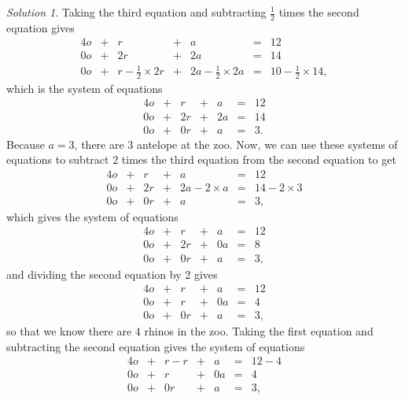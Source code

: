 \documentclass[
]{book}
\theoremstyle{definition}
\theoremstyle{definition}
\theoremstyle{definition}
\theoremstyle{definition}
\theoremstyle{remark}
\newtheorem*{solution}{Solution}
\begin{document}
\begin{solution}
Taking the third equation and subtracting \(\frac{1}{2}\) times the second equation gives
\begin{alignat*}{4}
o   & {}+{} &  r  & {}+{} & a  & {}={} & 12 \\
0o  & {}+{} &  2r & {}+{} & 2a & {}={} & 14 \\
0o  & {}+{} &  r - \frac{1}{2} \times 2r  & {}+{} & 2a - \frac{1}{2} \times 2a & {}={} & 10 - \frac{1}{2} \times 14,
\end{alignat*}
which is the system of equations
\begin{alignat*}{4}
o   & {}+{} &  r  & {}+{} & a  & {}={} & 12 \\
0o  & {}+{} &  2r & {}+{} & 2a & {}={} & 14 \\
0o  & {}+{} &  0r  & {}+{} & a & {}={} & 3.
\end{alignat*}
Because \(a = 3\), there are 3 antelope at the zoo. Now, we can use these systems of equations to subtract 2 times the third equation from the second equation to get
\begin{alignat*}{4}
o   & {}+{} &  r  & {}+{} & a  & {}={} & 12 \\
0o  & {}+{} &  2r & {}+{} & 2a - 2 \times a & {}={} & 14 - 2 \times 3 \\
0o  & {}+{} &  0r  & {}+{} & a & {}={} & 3, 
\end{alignat*}
which gives the system of equations
\begin{alignat*}{4}
o   & {}+{} &  r  & {}+{} & a  & {}={} & 12 \\
0o  & {}+{} &  2r & {}+{} & 0a & {}={} & 8 \\
0o  & {}+{} &  0r  & {}+{} & a & {}={} & 3, 
\end{alignat*}
and dividing the second equation by 2 gives
\begin{alignat*}{4}
o   & {}+{} &  r  & {}+{} & a  & {}={} & 12 \\
0o  & {}+{} &  r & {}+{} & 0a & {}={} & 4 \\
0o  & {}+{} &  0r  & {}+{} & a & {}={} & 3, 
\end{alignat*}
so that we know there are 4 rhinos in the zoo. Taking the first equation and subtracting the second equation gives the system of equations
\begin{alignat*}{4}
o   & {}+{} &  r - r  & {}+{} & a  & {}={} & 12 - 4\\
0o  & {}+{} &  r & {}+{} & 0a & {}={} & 4 \\
0o  & {}+{} &  0r  & {}+{} & a & {}={} & 3, 
\end{alignat*}

\end{solution}
\end{document}
